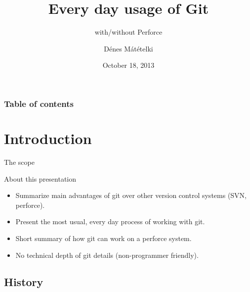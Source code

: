 \documentclass{beamer}
\title {Every day usage of Git}
\subtitle{with/without Perforce}
\author{Dénes Mátételki}
\institute{www.emerson.com}
\date{October 18, 2013}
\begin{document}

\begin{frame}
\titlepage
\end{frame}


\begin{frame}
\frametitle{Table of contents}
\tableofcontents
\end{frame}



\section{Introduction}

\begin{frame}{The scope}

\begin{block}{About this presentation}
\begin{itemize}
 \item Summarize main advantages of git over other version control systems (SVN, perforce).
 \item Present the most usual, every day process of working with git.
 \item Short summary of how git can work on a perforce system.
 \item No technical depth of git details (non-programmer friendly).
\end{itemize}
\end{block}

\end{frame}


\subsection{History}
\end{document}
